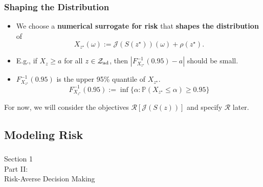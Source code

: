 \documentclass[aspectratio=169,xcolor=dvipsnames,10pt]{beamer}
\newcommand{\Zad}{\mathcal{Z}_{\text{\textup{ad}}}}
\newcommand{\risk}{\mathcal{R}}
\begin{document}
\begin{frame}\frametitle{Shaping the Distribution}
\begin{exampleblock}{}
\begin{itemize}
\item We choose a \textbf{numerical surrogate for risk} that \textbf{shapes the distribution} of
\[
X_{z^{\star}}(\omega) := \mathcal{J}(S(z^{\star}))(\omega) + \rho(z^{\star}).
\] 
\item E.g., if $X_{z} \ge a$ for all $z \in \Zad$, then  $|F_{X_{z^{\star}}}^{-1}(0.95)-a|$ should be small.
\item $F_{X_{z^{\star}}}^{-1}(0.95)$ is the upper 95\% quantile of $X_{z^{\star}}$.
\[
F_{X_{z^{\star}}}^{-1}(0.95) := \inf \{ \alpha : \mathbb P(X_{z^{\star}} \le \alpha ) \ge 0.95 \}
\]
\end{itemize}
\end{exampleblock}
\begin{exampleblock}{}
\centering
For now, we will consider the objectives $\risk[\mathcal{J}(S(z))]$ and specify $\risk$ later.
\end{exampleblock}
\end{frame}




\subsection{Modeling Risk}

\begin{frame}\frametitle{}
\begin{center}\Large
Section 1\\
Part II:\\
Risk-Averse Decision Making 
\end{center}\bigskip

\end{frame}
\end{document}

